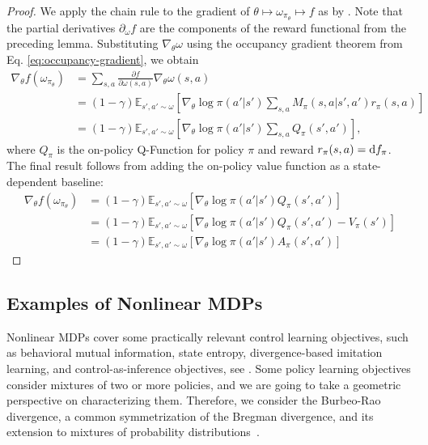 \documentclass{article}
\theoremstyle{plain}
\theoremstyle{definition}
\theoremstyle{remark}
\begin{document}
\begin{proof}
    We apply the chain rule to the gradient of $\theta\mapsto\omega_{\pi_\theta}\mapsto f $ as by \citep{zhang2020variational}. 
    Note that the partial derivatives $\partial_\omega f$ are the components of the reward functional from the preceding lemma. 
    Substituting $\nabla_\theta \omega$ using the occupancy gradient theorem from Eq. \ref{eq:occupancy-gradient}, we obtain
    \begin{align}
    \nabla_\theta f(\omega_{\pi_\theta}) 
    &= \sum_{s,a}\frac{\partial f}{\partial \omega(s,a)} \nabla_{\theta} \omega (s,a)\\
    &= (1-\gamma)\mathbb{E}_{s',a' \sim \omega} \left[ \nabla_\theta \log\pi(a'|s')\sum_{s,a} M_\pi(s,a|s',a')r_\pi(s,a)\right]\\
    &= (1-\gamma)\mathbb{E}_{s',a' \sim \omega} \left[ \nabla_\theta \log\pi(a'|s')\sum_{s,a} Q_\pi(s',a')\right],
    \end{align}
    where $Q_\pi$ is the on-policy Q-Function for policy $\pi$ and reward $r_\pi(s,a) = \textup{d}f_\pi$.
    The final result follows from adding the on-policy value function as a state-dependent baseline:
    \begin{align}
    \nabla_\theta f(\omega_{\pi_\theta}) &= (1-\gamma)\mathbb{E}_{s',a' \sim \omega} \left[ \nabla_\theta \log\pi(a'|s')Q_\pi(s',a')\right]\\
    &= (1-\gamma)\mathbb{E}_{s',a' \sim \omega} \left[ \nabla_\theta \log\pi(a'|s')Q_\pi(s',a') - V_\pi(s')\right]\\
    &= (1-\gamma)\mathbb{E}_{s',a' \sim \omega} \left[ \nabla_\theta \log\pi(a'|s')A_\pi(s',a')\right]
\end{align}
\end{proof}

\subsection{Examples of Nonlinear MDPs}
Nonlinear MDPs cover some practically relevant control learning objectives, such as behavioral mutual information, state entropy, divergence-based imitation learning, and control-as-inference objectives, see \citep{zahavy2021reward}.
Some policy learning objectives consider mixtures of two or more policies, and we are going to take a geometric perspective on characterizing them.
Therefore, we consider the Burbeo-Rao divergence, a common symmetrization of the Bregman divergence, and its extension to mixtures of probability distributions~\citep{nielsen2011burbea, burbea2003convexity}.
\end{document}
